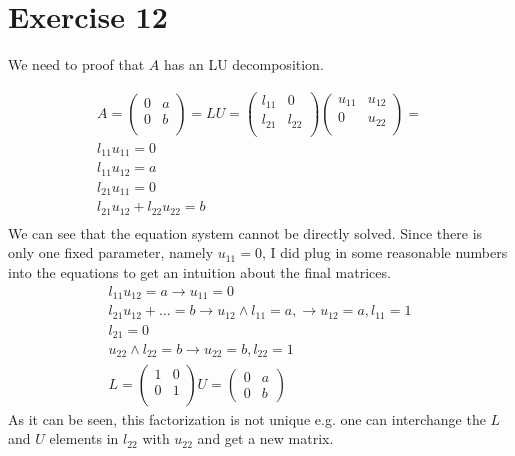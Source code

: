 \section{Exercise 12}
We need to proof that $A$ has an LU decomposition.

\begin{gather*}
A = \left( \begin{array}{cc}
0 & a \\
0 & b \\
\end{array} \right)
= LU = 
\left( \begin{array}{cc}
l_{11} & 0 \\
l_{21} & l_{22} \\
\end{array} \right)
\left( \begin{array}{cc}
u_{11} & u_{12} \\
0 & u_{22} \\
\end{array} \right)
= \\
l_{11} u_{11} = 0 \\
l_{11} u_{12} = a \\
l_{21} u_{11} = 0 \\
l_{21} u_{12} + l_{22} u_{22} = b \\
\end{gather*}
We can see that the equation system cannot be directly solved.
Since there is only one fixed parameter, namely $u_{11} = 0$, I did plug in some reasonable numbers into the equations to get an intuition about the final matrices.
\begin{gather*}
l_{11} u_{12} = a \rightarrow  u_{11} = 0 \\
l_{21} u_{12} + \ldots = b \rightarrow  u_{12} \wedge l_{11} = a , \rightarrow u_{12} = a , l_{11} = 1 \\
l_{21} = 0 \\
u_{22} \wedge l_{22} = b \rightarrow u_{22} = b, l_{22} = 1 \\
L =
\left( \begin{array}{cc}
1 & 0 \\
0 & 1 \\
\end{array} \right)
U =
\left( \begin{array}{cc}
0 & a\\
0 & b 
\end{array} \right)
\end{gather*}
As it can be seen, this factorization is not unique e.g. one can interchange the $L$ and $U$ elements in $l_{22}$ with $u_{22}$ and get a new matrix.
